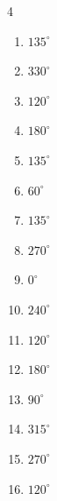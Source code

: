 \begin{multicols}{4}
\begin{enumerate}
  \item $\displaystyle 135^{\circ}$

  \item $\displaystyle 330^{\circ}$

  \item $\displaystyle 120^{\circ}$

  \item $\displaystyle 180^{\circ}$
        \phantom{$\displaystyle =\pi$}

\columnbreak %

  \item $\displaystyle 135^{\circ}$

  \item $\displaystyle 60^{\circ}$

  \item $\displaystyle 135^{\circ}$

  \item $\displaystyle 270^{\circ}$

  \item $\displaystyle 0^{\circ}$
        \phantom{$\displaystyle =0$}

  \item $\displaystyle 240^{\circ}$

  \item $\displaystyle 120^{\circ}$

  \item $\displaystyle 180^{\circ}$
        \phantom{$\displaystyle =\pi$}

  \item $\displaystyle 90^{\circ}$

  \item $\displaystyle 315^{\circ}$

  \item $\displaystyle 270^{\circ}$

  \item $\displaystyle 120^{\circ}$


\end{enumerate}
\end{multicols}
